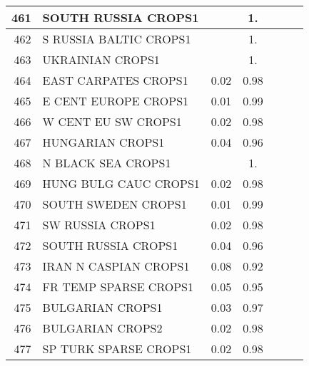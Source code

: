 {{\begin{tabular}{||r|l||c|c|c|c|c||}
 \hline
         461  & SOUTH RUSSIA CROPS1                                          &       &  1.   &       &       \\
 \hline
         462  & S RUSSIA BALTIC CROPS1                                       &       &  1.   &       &       \\
 \hline
         463  & UKRAINIAN CROPS1                                             &       &  1.   &       &       \\
 \hline
         464  & EAST CARPATES CROPS1                                         &  0.02 &  0.98 &       &       \\
 \hline
         465  & E CENT EUROPE CROPS1                                         &  0.01 &  0.99 &       &       \\
 \hline
         466  & W CENT EU SW CROPS1                                          &  0.02 &  0.98 &       &       \\
 \hline
         467  & HUNGARIAN CROPS1                                             &  0.04 &  0.96 &       &       \\
 \hline
         468  & N BLACK SEA CROPS1                                           &       &  1.   &       &       \\
 \hline
         469  & HUNG BULG CAUC CROPS1                                        &  0.02 &  0.98 &       &       \\
 \hline
         470  & SOUTH SWEDEN CROPS1                                          &  0.01 &  0.99 &       &       \\
 \hline
         471  & SW RUSSIA CROPS1                                             &  0.02 &  0.98 &       &       \\
 \hline
         472  & SOUTH RUSSIA CROPS1                                          &  0.04 &  0.96 &       &       \\
 \hline
         473  & IRAN N CASPIAN CROPS1                                        &  0.08 &  0.92 &       &       \\
 \hline
         474  & FR TEMP SPARSE CROPS1                                        &  0.05 &  0.95 &       &       \\
 \hline
         475  & BULGARIAN CROPS1                                             &  0.03 &  0.97 &       &       \\
 \hline
         476  & BULGARIAN CROPS2                                             &  0.02 &  0.98 &       &       \\
 \hline
         477  & SP TURK SPARSE CROPS1                                        &  0.02 &  0.98 &       &       \\

\end{tabular}}}
